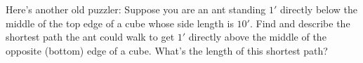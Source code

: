 \documentclass[noauthor,nooutcomes,hints,handout]{ximera}
\begin{document}
\begin{question}
  Here's another old puzzler: Suppose you are an ant standing $1'$
  directly below the middle of the top edge of a cube whose side
  length is $10'$. Find and describe the shortest path the ant could
  walk to get $1'$ directly above the middle of the opposite (bottom)
  edge of a cube. What's the length of this shortest path?

\end{question}
\end{document}
